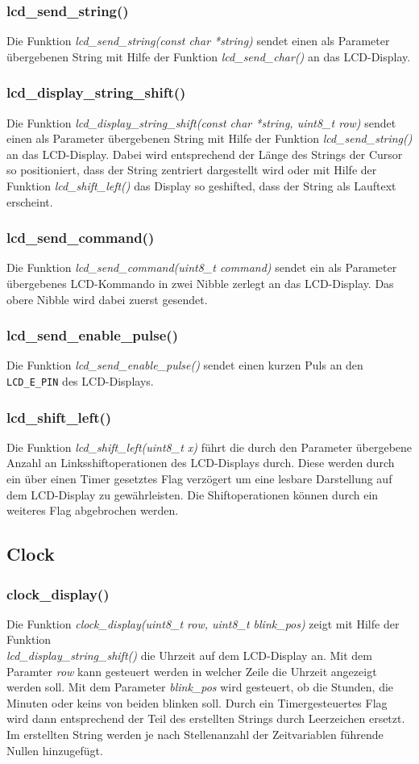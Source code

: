 \documentclass[10pt]{scrartcl}
\begin{document}
\subsubsection{lcd\_send\_string()}
Die Funktion \textit{lcd\_send\_string(const char *string)} sendet einen als Parameter übergebenen String mit Hilfe der Funktion \textit{lcd\_send\_char()} an das LCD-Display.
\subsubsection{lcd\_display\_string\_shift()}
Die Funktion \textit{lcd\_display\_string\_shift(const char *string, uint8\_t row)} sendet einen als Parameter übergebenen String mit Hilfe der Funktion \textit{lcd\_send\_string()} an das LCD-Display. Dabei wird entsprechend der Länge des Strings der Cursor so positioniert, dass der String zentriert dargestellt wird oder mit Hilfe der Funktion \textit{lcd\_shift\_left()} das Display so geshifted, dass der String als Lauftext erscheint.
\subsubsection{lcd\_send\_command()}
Die Funktion \textit{lcd\_send\_command(uint8\_t command)} sendet ein als Parameter übergebenes LCD-Kommando in zwei Nibble zerlegt an das LCD-Display. Das obere Nibble wird dabei zuerst gesendet.
\subsubsection{lcd\_send\_enable\_pulse()}
Die Funktion \textit{lcd\_send\_enable\_pulse()} sendet einen kurzen Puls an den \texttt{LCD\_E\_PIN} des LCD-Displays. 
\subsubsection{lcd\_shift\_left()}
Die Funktion \textit{lcd\_shift\_left(uint8\_t x)} führt die durch den Parameter übergebene Anzahl an Linksshiftoperationen des LCD-Displays durch. Diese werden durch ein über einen Timer gesetztes Flag verzögert um eine lesbare Darstellung auf dem LCD-Display zu gewährleisten. Die Shiftoperationen können durch ein weiteres Flag abgebrochen werden.
\subsection{Clock}
\subsubsection{clock\_display()}
Die Funktion \textit{clock\_display(uint8\_t row, uint8\_t blink\_pos)} zeigt mit Hilfe der Funktion\\ \textit{lcd\_display\_string\_shift()} die Uhrzeit auf dem LCD-Display an. Mit dem Paramter \textit{row} kann gesteuert werden in welcher Zeile die Uhrzeit angezeigt werden soll. Mit dem Parameter \textit{blink\_pos} wird gesteuert, ob die Stunden, die Minuten oder keins von beiden blinken soll. Durch ein Timergesteuertes Flag wird dann entsprechend der Teil des erstellten Strings durch Leerzeichen ersetzt. Im erstellten String werden je nach Stellenanzahl der Zeitvariablen führende Nullen hinzugefügt.
\end{document}
